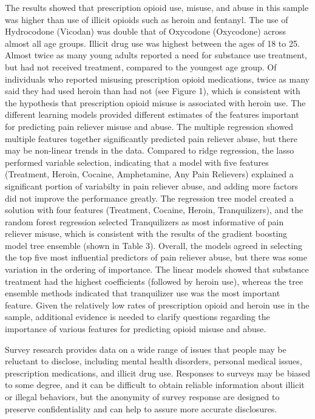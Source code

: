 \documentclass[sigconf]{acmart}
\begin{document}
The results showed that prescription opioid use, misuse, and abuse in this 
sample was higher than use of illicit opioids such as heroin and fentanyl. 
The use of Hydrocodone (Vicodan) was double that of Oxycodone (Oxycodone) 
across almost all age groups. Illicit drug use was highest between the ages 
of 18 to 25. Almost twice as many young adults reported a need for substance 
use treatment, but had not received treatment, compared to the youngest age 
group. Of individuals who reported misusing prescription opioid medications, 
twice as many said they had used heroin than had not (see Figure 1), which is 
consistent with the hypothesis that prescription opioid misuse is associated 
with heroin use. The different learning models provided different estimates 
of the features important for predicting pain reliever misuse and abuse. 
The multiple regression showed multiple features together significantly 
predicted pain reliever abuse, but there may be non-linear trends in the data.
Compared to ridge regression, the lasso performed variable selection, 
indicating that a model with five features (Treatment, Heroin, Cocaine, 
Amphetamine, Any Pain Relievers) explained a significant portion of
variabilty in pain reliever abuse, and adding more factors did not improve
the performance greatly. The regression tree model created a solution
with four features (Treatment, Cocaine, Heroin, Tranquilizers), and the
random forest regression selected Tranquilizers as most informative of
pain reliever misuse, which is consistent with the results of the gradient
boosting model tree ensemble (shown in Table 3). Overall, the models 
agreed in selecting the top five most influential predictors of pain
reliever abuse, but there was some variation in the ordering of importance. 
The linear models showed that substance treatment had the highest
coefficients (followed by heroin use), whereas the tree ensemble methods
indicated that tranquilizer use was the most important feature. Given the 
relatively low rates of prescription opioid and heroin use in the sample, 
additional evidence is needed to clarify questions regarding the importance
of various features for predicting opioid misuse and abuse. 
 
Survey research 
provides data on a wide range of issues that people may be reluctant to 
disclose, including mental health disorders, personal medical issues, 
prescription medications, and illicit drug use. Responses to surveys may be 
biased to some degree, and it can be difficult to obtain reliable information 
about illicit or illegal behaviors, but the anonymity of survey response are 
designed to preserve confidentiality and can help to assure more accurate 
disclosures. 
\end{document}
